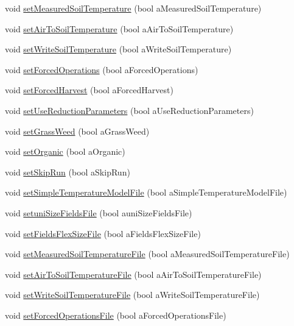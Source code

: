 \begin{DoxyCompactItemize}
void \hyperlink{classsystem_data_a50e8ba1807a6cfffff6e7fbc957aca37}{setMeasuredSoilTemperature} (bool aMeasuredSoilTemperature)
\item 
void \hyperlink{classsystem_data_ab7ae597dd9497fd07d8c6415949c91dd}{setAirToSoilTemperature} (bool aAirToSoilTemperature)
\item 
void \hyperlink{classsystem_data_a5c262bbd51cda692ed4a2592127e5f7e}{setWriteSoilTemperature} (bool aWriteSoilTemperature)
\item 
void \hyperlink{classsystem_data_ae9c09de52aee3e937053fdb9c821fc3a}{setForcedOperations} (bool aForcedOperations)
\item 
void \hyperlink{classsystem_data_ae35b9d86ccd7daeaa075d2f5c0ac8285}{setForcedHarvest} (bool aForcedHarvest)
\item 
void \hyperlink{classsystem_data_ab0311529bdd84d8662d3b9b6de4a95da}{setUseReductionParameters} (bool aUseReductionParameters)
\item 
void \hyperlink{classsystem_data_a8ed653bc146633d6ad3eeeeb47b74d9d}{setGrassWeed} (bool aGrassWeed)
\item 
void \hyperlink{classsystem_data_a00284a739378bb2a6839a93c071dcf18}{setOrganic} (bool aOrganic)
\item 
void \hyperlink{classsystem_data_a5adb28039eb1e457814248bcc6f7cdad}{setSkipRun} (bool aSkipRun)
\item 
void \hyperlink{classsystem_data_a4fa3efc09031a02d90263399038a6bcb}{setSimpleTemperatureModelFile} (bool aSimpleTemperatureModelFile)
\item 
void \hyperlink{classsystem_data_aee44dc82abe589959b8475a3a80ac608}{setuniSizeFieldsFile} (bool auniSizeFieldsFile)
\item 
void \hyperlink{classsystem_data_a45e04b4802db3e711609183f8fad7610}{setFieldsFlexSizeFile} (bool aFieldsFlexSizeFile)
\item 
void \hyperlink{classsystem_data_a8c57f6c008c35fce32e9bd5acde8bb17}{setMeasuredSoilTemperatureFile} (bool aMeasuredSoilTemperatureFile)
\item 
void \hyperlink{classsystem_data_a6044b4807c348caa71defc82c5bc888d}{setAirToSoilTemperatureFile} (bool aAirToSoilTemperatureFile)
\item 
void \hyperlink{classsystem_data_a1d96b07171117ad17648b6e2040a33d9}{setWriteSoilTemperatureFile} (bool aWriteSoilTemperatureFile)
\item 
void \hyperlink{classsystem_data_a5befeffba89c8a0a9623ae902e2ccff8}{setForcedOperationsFile} (bool aForcedOperationsFile)

\end{DoxyCompactItemize}
